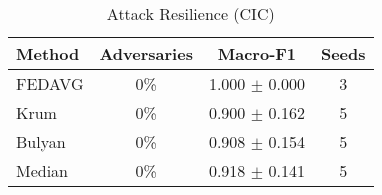 \begin{table}[htbp]
\centering
\caption{Attack Resilience (CIC)}\label{tab:attack_cic}
\begin{tabular}{lccc}
\toprule
Method & Adversaries & Macro-F1 & Seeds \\
\midrule
FEDAVG & 0\% & 1.000 $\pm$ 0.000 & 3 \\
Krum & 0\% & 0.900 $\pm$ 0.162 & 5 \\
Bulyan & 0\% & 0.908 $\pm$ 0.154 & 5 \\
Median & 0\% & 0.918 $\pm$ 0.141 & 5 \\
\bottomrule
\end{tabular}
\end{table}
